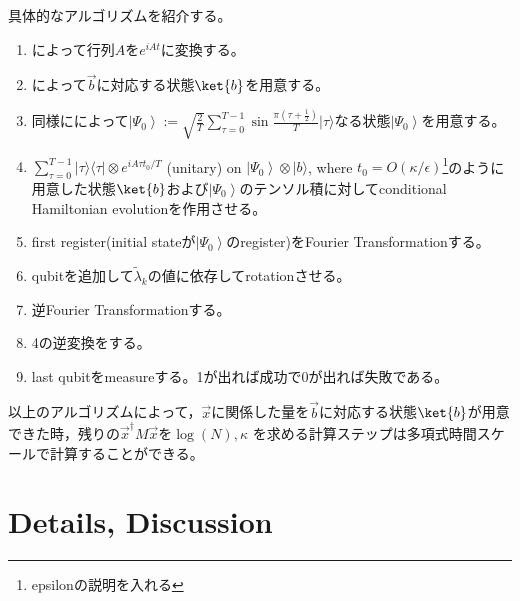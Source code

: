 \documentclass[b5paper,papersize,dvipdfmx,fleqn]{jsarticle}
\begin{document}
具体的なアルゴリズムを紹介する。
\begin{enumerate}
  \item \cite{Berry2007}によって行列$A$を$e^{iAt}$に変換する。
  \item \cite{Grover2002}によって$\vec{b}$に対応する状態$\ket{b}$を用意する。
  \item 同様に\cite{Grover2002}によって$\displaystyle \left|\Psi_{0}\right\rangle:=\sqrt{\frac{2}{T}} \sum_{\tau=0}^{T-1} \sin \frac{\pi\left(\tau+\frac{1}{2}\right)}{T}|\tau\rangle$なる状態$\left|\Psi_{0}\right\rangle$を用意する。
  \item $\displaystyle \sum_{\tau=0}^{T-1}|\tau\rangle\langle\tau| \otimes e^{i A \tau t_{0} / T}$ (unitary) on $\left|\Psi_{0}\right\rangle \otimes|b\rangle$, where $t_{0}=O(\kappa / \epsilon)$\footnote{epsilonの説明を入れる}のように用意した状態$\ket{b}$および$\left|\Psi_{0}\right\rangle$のテンソル積に対してconditional Hamiltonian evolutionを作用させる。
  \item first register(initial stateが$\left|\Psi_{0}\right\rangle$のregister)をFourier Transformationする。
  \item qubitを追加して$\tilde{\lambda}_{k}$の値に依存してrotationさせる。
  \item 逆Fourier Transformationする。
  \item 4の逆変換をする。
  \item last qubitをmeasureする。1が出れば成功で0が出れば失敗である。
\end{enumerate}
以上のアルゴリズムによって，$\vec{x}$に関係した量を$\vec{b}$に対応する状態$\ket{b}$が用意できた時，残りの$\vec{x}^\dagger M \vec{x}$を$\log(N),\kappa $ を求める計算ステップは多項式時間スケールで計算することができる。


\section{Details, Discussion}
\end{document}
